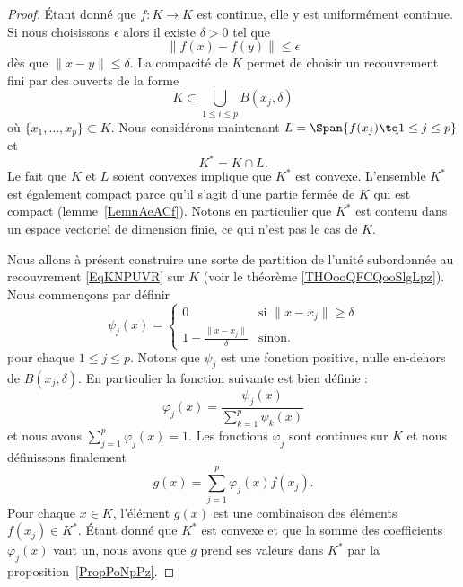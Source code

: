 \begin{proof}
	Étant donné que \( f\colon K\to K\) est continue, elle y est uniformément continue. Si nous choisissons \( \epsilon\) alors il existe \( \delta>0\) tel que
	\begin{equation}
		\| f(x)-f(y) \|\leq \epsilon
	\end{equation}
	dès que \( \| x-y \|\leq \delta\). La compacité de \( K\) permet de choisir un recouvrement fini par des ouverts de la forme
	\begin{equation}    \label{EqKNPUVR}
		K\subset \bigcup_{1\leq i\leq p}B(x_j,\delta)
	\end{equation}
	où \( \{ x_1,\ldots, x_p \}\subset K\). Nous considérons maintenant \( L=\Span\{ f(x_j)\tq 1\leq j\leq p \}\) et
	\begin{equation}
		K^*=K\cap L.
	\end{equation}
	Le fait que \( K\) et \( L\) soient convexes implique que \( K^*\) est convexe. L'ensemble \( K^*\) est également compact parce qu'il s'agit d'une partie fermée de \( K\) qui est compact (lemme~\ref{LemnAeACf}). Notons en particulier que \( K^*\) est contenu dans un espace vectoriel de dimension finie, ce qui n'est pas le cas de \( K\).

	Nous allons à présent construire une sorte de partition de l'unité subordonnée au recouvrement \eqref{EqKNPUVR} sur \( K\)
	(voir le théorème  \ref{THOooQFCQooSlgLpz}). Nous commençons par définir
	\begin{equation}
		\psi_j(x)=\begin{cases}
			0                                & \text{si } \| x-x_j \|\geq \delta \\
			1-\frac{ \| x-x_j \| }{ \delta } & \text{sinon}.
		\end{cases}
	\end{equation}
	pour chaque \( 1\leq j\leq p\). Notons que \( \psi_j\) est une fonction positive, nulle en-dehors de \( B(x_j,\delta)\). En particulier la fonction suivante est bien définie :
	\begin{equation}
		\varphi_j(x)=\frac{ \psi_j(x) }{ \sum_{k=1}^p\psi_k(x) }
	\end{equation}
	et nous avons \( \sum_{j=1}^p\varphi_j(x)=1\). Les fonctions \( \varphi_j\) sont continues sur \( K\) et nous définissons finalement
	\begin{equation}
		g(x)=\sum_{j=1}^p\varphi_j(x)f(x_j).
	\end{equation}
	Pour chaque \( x\in K\), l'élément \( g(x)\) est une combinaison des éléments \( f(x_j)\in K^*\). Étant donné que \( K^*\) est convexe et que la somme des coefficients \( \varphi_j(x)\) vaut un, nous avons que \( g\) prend ses valeurs dans \( K^*\) par la proposition~\ref{PropPoNpPz}.


\end{proof}
